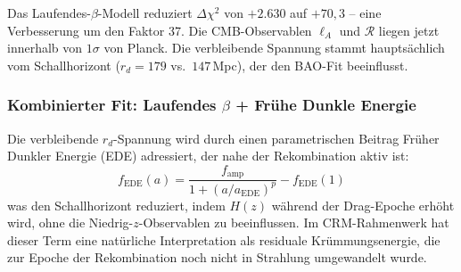 \documentclass[aps,prd,twocolumn,superscriptaddress,nofootinbib,floatfix]{revtex4-2}
\begin{document}
\begin{table}[t]
\centering
\caption{Laufendes-$\beta$-CRM: optimierte Parameter und Vergleich mit $\Lambda$CDM.}
\label{tab:running_beta}
\end{table}

Das Laufendes-$\beta$-Modell reduziert $\Delta\chi^2$ von $+2.630$ auf $+70{,}3$ -- eine Verbesserung um den Faktor 37. Die CMB-Observablen $\ell_A$ und $\mathcal{R}$ liegen jetzt innerhalb von $1\sigma$ von Planck. Die verbleibende Spannung stammt hauptsächlich vom Schallhorizont ($r_d = 179$ vs.\ $147$\,Mpc), der den BAO-Fit beeinflusst.

\subsubsection{Kombinierter Fit: Laufendes \texorpdfstring{$\beta$}{beta} + Frühe Dunkle Energie}

Die verbleibende $r_d$-Spannung wird durch einen parametrischen Beitrag Früher Dunkler Energie (EDE) adressiert, der nahe der Rekombination aktiv ist:
\begin{equation}
f_{\mathrm{EDE}}(a) = \frac{f_{\mathrm{amp}}}{1 + (a/a_{\mathrm{EDE}})^p} - f_{\mathrm{EDE}}(1)
\end{equation}
was den Schallhorizont reduziert, indem $H(z)$ während der Drag-Epoche erhöht wird, ohne die Niedrig-$z$-Observablen zu beeinflussen. Im CRM-Rahmenwerk hat dieser Term eine natürliche Interpretation als residuale Krümmungsenergie, die zur Epoche der Rekombination noch nicht in Strahlung umgewandelt wurde.
\end{document}
